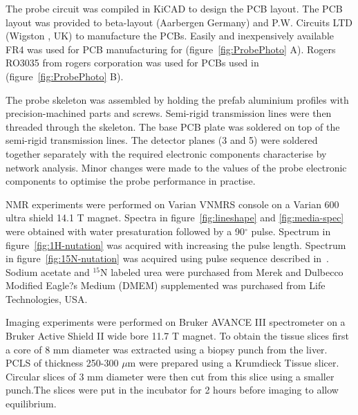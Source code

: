 \documentclass[preprint,12pt]{article}
\begin{document}
The probe circuit was compiled in KiCAD to design the PCB layout. The PCB layout was provided to beta-layout (Aarbergen Germany) and P.W. Circuits LTD (Wigston , UK) to manufacture the PCBs. Easily and inexpensively available FR4 was used for PCB manufacturing for (figure~\ref{fig:ProbePhoto} A). Rogers RO3035 from rogers corporation was used for PCBs used in (figure~\ref{fig:ProbePhoto} B).\par
The probe skeleton was assembled by holding the prefab aluminium profiles with precision-machined parts and screws. Semi-rigid transmission lines were then threaded through the skeleton. The base PCB plate was soldered on top of the semi-rigid transmission lines. The detector planes (3 and 5) were soldered together separately with the required electronic components characterise by network analysis. Minor changes were made to the values of the probe electronic components to optimise the probe performance in practise.\par
NMR experiments were performed on Varian VNMRS console on a Varian 600 ultra shield 14.1 T magnet. Spectra in figure~\ref{fig:lineshape} and \ref{fig:media-spec} were obtained with water presaturation followed by a 90$^{\circ}$ pulse. Spectrum in figure~\ref{fig:1H-nutation} was acquired with increasing the pulse length. Spectrum in figure~\ref{fig:15N-nutation} was acquired using pulse sequence described in~\cite{bax_indirect}. Sodium acetate and $^{15}$N labeled urea were purchased from Merek and Dulbecco Modified Eagle?s Medium (DMEM) supplemented was purchased from Life Technologies, USA.\par
Imaging experiments were performed on Bruker AVANCE III spectrometer on a Bruker Active Shield II wide bore 11.7 T magnet. To obtain the tissue slices first a core of 8 mm diameter was extracted using a biopsy punch from the liver. PCLS of thickness 250-300 $\mu$m were prepared using a Krumdieck Tissue slicer. Circular slices of 3 mm diameter were then cut from this slice using a smaller punch.The slices were put in the incubator for 2 hours before imaging to allow equilibrium.
\end{document}
